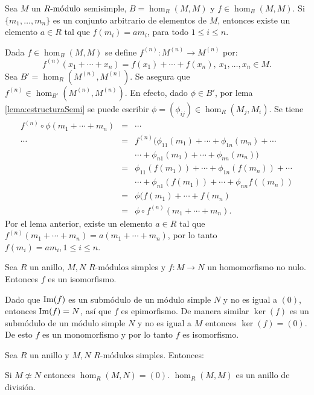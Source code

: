 \begin{teorema}
Sea $M$ un $\modulo{R}$ semisimple, $B= \hom_R(M,M)$ y $f \in  \hom_B(M,M)$. Si $\{ m_1, \dots, m_n \}$ es un conjunto arbitrario de elementos de $M$, entonces existe un elemento $a \in R$ tal que $f(m_i) = am_i$, para todo $1\leq i \leq n$.
\end{teorema}
\begin{proof*}
Dada $f \in \hom_B(M,M)$ se define $f^{(n)} \colon M^{(n)} \to M^{(n)}$ por: \[ f^{(n)}(x_1 + \cdots + x_n) = f(x_1) + \cdots+ f(x_n), \ x_1, \dots, x_n \in M. \]
Sea $B' = \hom_R(M^{(n)}, M^{(n)})$. Se asegura que $f^{(n)} \in \hom_{B'}(M^{(n)}, M^{(n)})$. En efecto, dado $\phi \in B'$, por lema \ref{lema:estructuraSemi} se puede escribir $\phi = (\phi_{ij}) \in \hom_R(M_j,M_i)$. Se tiene
\begin{eqnarray*}
f^{(n)} \circ \phi(m_1+\cdots +m_n) &=& \cdots \\ 
\cdots &=& f^{(n)}(\phi_{11}(m_1) +\cdots+\phi_{1n}(m_n)+\cdots\\ 
& &\cdots +\phi_{n1}(m_1)+\cdots+\phi_{nn}(m_n))  \\
&=& \phi_{11}(f(m_1)) + \cdots + \phi_{1n}(f(m_n)) + \cdots \\ 
& &\cdots + \phi_{n1}(f(m_1 )) + \cdots + \phi_{nn}f((m_n))   \\
&=& \phi(f(m_1) + \cdots + f(m_n)  \\
&=&\phi \circ f^{(n)}(m_1 + \cdots + m_n).
\end{eqnarray*}
Por el lema anterior, existe un elemento $a \in R$ tal que $f^{(n)}(m_1+\cdots+m_n) = a(m_1+\cdots+m_n)$, por lo tanto $f(m_i) = am_i, 1\leq i \leq n$.
\end{proof*}
\begin{lema}
Sea $R$ un anillo, $M,N$ $R\mbox{-módulos}$ simples y $f \colon M \to N$ un homomorfismo no nulo. Entonces $f$ es un isomorfismo.
\end{lema}
\begin{proof*}
Dado que $\Ima(f)$ es un submódulo de un módulo simple $N$ y no es igual a $(0)$, entonces $\Ima(f) = N$, así que $f$ es epimorfismo. De manera similar $\ker(f)$ es un submódulo de un módulo simple $N$ y no es igual a $M$ entonces $\ker(f) = (0)$. De esto $f$ es un monomorfismo y por lo tanto $f$ es isomorfismo.
\end{proof*}
\begin{corolario}
Sea $R$ un anillo y $M,N$ $R\mbox{-módulos}$ simples. Entonces:
\begin{bulletList}
\newItem Si $M \not\simeq N$ entonces $\hom_R(M,N) = (0)$.
\newItem $\hom_R(M,M)$ es un anillo de división. 
\end{bulletList}
\end{corolario}
